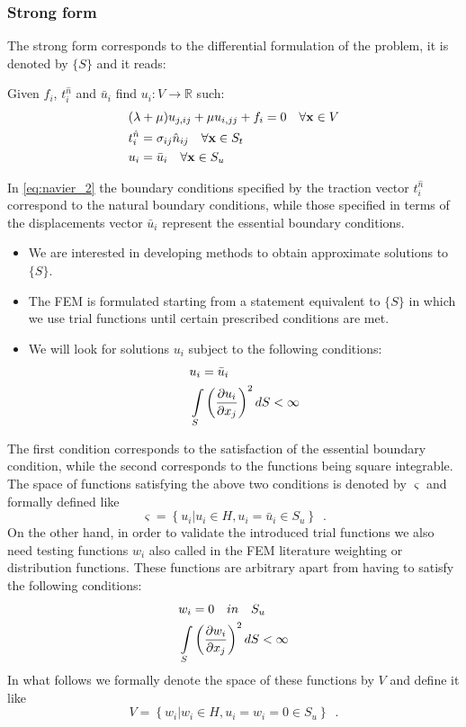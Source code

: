 \subsubsection{Strong form}
The strong form corresponds to the differential formulation of the problem, it is denoted by $\{ S \}$ and it reads:

Given $f_i$, $t_i^{\hat n}$ and ${\bar u_i}$ find ${u_i}:V \to \mathbb{R}$ such:
%
\begin{equation} \label{eq:navier_2}
\begin{split}
&(\lambda  + \mu)u_{j,ij} + \mu u_{i,jj} + f_i = 0 \quad \forall \vb{x} \in V \\
&t_i^{\hat n} = \sigma _{ij} \hat{n}_{ij} \quad \forall \vb{x} \in S_t\\
&u_i = \bar{u}_i \quad \forall \vb{x} \in S_u
\end{split}
\end{equation}

In \cref{eq:navier_2} the boundary conditions specified by the traction vector $t_i^{\hat n}$ correspond to the natural boundary conditions, while those specified in terms of the displacements vector $\bar u_i$ represent the essential boundary conditions.

\begin{itemize}
\item We are interested in developing methods to obtain approximate solutions to $\{S\}$.
\item The FEM is formulated starting from a statement equivalent to $\{ S \}$ in which we use trial functions until certain prescribed conditions are met.
\item We will look for solutions $u_i$ subject to the following conditions:
\begin{align*}
&u_i = \bar u_i\\
&\int\limits_S \left(\pdv{u_i}{x_j} \right)^2 dS < \infty
\end{align*}

\end{itemize}

The first condition corresponds to the satisfaction of the essential boundary condition, while the second corresponds to the functions being square integrable. The space of functions satisfying the above two conditions is denoted by $\varsigma$ and formally defined like
%
\[\varsigma = \left\{u_i\left| {u_i} \in H, {u_i} = \bar{u}_i \in S_u \right. \right\} \enspace .\]
%
On the other hand, in order to validate the introduced trial functions we also need testing functions $w_i$ also called in the FEM literature weighting or distribution functions. These functions are arbitrary apart from having to satisfy the following conditions:
%
\begin{align*}
&w_i = 0 \quad in \quad {S_u}\\
&\int\limits_S \left(\pdv{w_i}{x_j}\right)^2 dS < \infty
\end{align*}
%
In what follows we formally denote the space of these functions by $V$ and define it like
%
\[V = \left\{ w_i\left| w_i \in H, u_i = w_i=0 \in S_u \right. \right\} \enspace .\]

